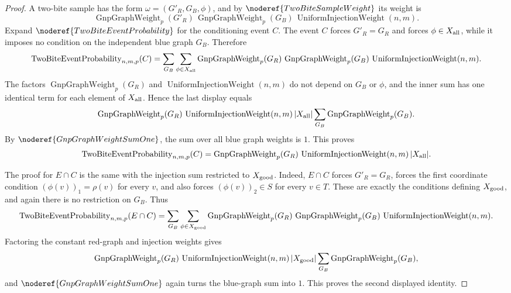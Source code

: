 \begin{proof}
A two-bite sample has the form \(\omega=(G'_R,G_B,\phi)\), and by
\(\noderef{TwoBiteSampleWeight}\) its weight is
\[
\operatorname{GnpGraphWeight}_p(G'_R)\,
\operatorname{GnpGraphWeight}_p(G_B)\,
\operatorname{UniformInjectionWeight}(n,m).
\]
Expand \(\noderef{TwoBiteEventProbability}\) for the conditioning event
\(C\).  The event \(C\) forces \(G'_R=G_R\) and forces
\(\phi\in X_{\rm all}\), while it imposes no condition on the independent
blue graph \(G_B\).  Therefore
\[
\operatorname{TwoBiteEventProbability}_{n,m,p}(C)
=\sum_{G_B}\sum_{\phi\in X_{\rm all}}
  \operatorname{GnpGraphWeight}_p(G_R)\,
  \operatorname{GnpGraphWeight}_p(G_B)\,
  \operatorname{UniformInjectionWeight}(n,m).
\]
The factors \(\operatorname{GnpGraphWeight}_p(G_R)\) and
\(\operatorname{UniformInjectionWeight}(n,m)\) do not depend on \(G_B\) or
\(\phi\), and the inner sum has one identical term for each element of
\(X_{\rm all}\).  Hence the last display equals
\[
\operatorname{GnpGraphWeight}_p(G_R)\,
\operatorname{UniformInjectionWeight}(n,m)\,|X_{\rm all}|
\sum_{G_B}\operatorname{GnpGraphWeight}_p(G_B).
\]
By \(\noderef{GnpGraphWeightSumOne}\), the sum over all blue graph weights is
\(1\).  This proves
\[
\operatorname{TwoBiteEventProbability}_{n,m,p}(C)
=\operatorname{GnpGraphWeight}_p(G_R)\,
  \operatorname{UniformInjectionWeight}(n,m)\,|X_{\rm all}|.
\]

The proof for \(E\cap C\) is the same with the injection sum restricted to
\(X_{\rm good}\).  Indeed, \(E\cap C\) forces \(G'_R=G_R\), forces the first
coordinate condition \((\phi(v))_1=\rho(v)\) for every \(v\), and also forces
\((\phi(v))_2\in S\) for every \(v\in T\).  These are exactly the conditions
defining \(X_{\rm good}\), and again there is no restriction on \(G_B\).  Thus
\[
\operatorname{TwoBiteEventProbability}_{n,m,p}(E\cap C)
=\sum_{G_B}\sum_{\phi\in X_{\rm good}}
  \operatorname{GnpGraphWeight}_p(G_R)\,
  \operatorname{GnpGraphWeight}_p(G_B)\,
  \operatorname{UniformInjectionWeight}(n,m).
\]
Factoring the constant red-graph and injection weights gives
\[
\operatorname{GnpGraphWeight}_p(G_R)\,
\operatorname{UniformInjectionWeight}(n,m)\,|X_{\rm good}|
\sum_{G_B}\operatorname{GnpGraphWeight}_p(G_B),
\]
and \(\noderef{GnpGraphWeightSumOne}\) again turns the blue-graph sum into
\(1\).  This proves the second displayed identity.
\end{proof}
